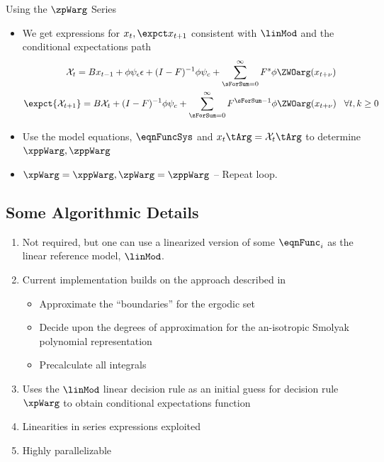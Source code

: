\documentclass[12pt]{article}
\begin{document}
{Using the $\zpWarg$ Series}
{\small
  \begin{itemize}
  \item We get expressions for $x_t, \expct x_{t+1}$ consistent with $\linMod$ and the conditional expectations path
   \begin{gather*}
     \mathcal{X}_{t} =B x_{t-1}+ \phi \psi_\epsilon\epsilon + (I - F)^{-1} \phi \psi_c + \sum_{\sForSum=0}^\infty F^s \phi \ZWOarg(x_{t+\nu})\\
	\expct{ \mathcal{X}_{t+1}} =B \mathcal{X}_{t}  + (I - F)^{-1} \phi \psi_c+ \sum_{\sForSum =0}^\infty F^{\sForSum-1} \phi \ZWOarg(x_{t+\nu}) \,\,\,\,\,\forall t,k \ge  0
\end{gather*}
\item Use the model equations, $\eqnFuncSys$ and $x_t\tArg=\mathcal{X}_t\tArg$ to determine $\xppWarg, \zppWarg$
\item $\xpWarg=\xppWarg, \zpWarg=\zppWarg$ -- {\color{green}Repeat loop.}
  \end{itemize}
}


\subsection{{Some Algorithmic Details}}


  


\begin{enumerate}
\item Not required, but one can use a linearized version of some $\eqnFunc_i$  as the  linear reference model, $\linMod$.
\item Current implementation builds on the approach described in \cite{Judd2014}
  \begin{itemize}
  \item Approximate the ``boundaries'' for the ergodic set
  \item Decide upon the  degrees of approximation for the an-isotropic Smolyak polynomial representation
  \item Precalculate all integrals
  \end{itemize}
\item Uses the $\linMod$ linear decision rule as an initial guess for decision rule $\xpWarg$ to obtain conditional expectations function
\item Linearities in series expressions exploited
\item Highly parallelizable 
\end{enumerate}
\end{document}
